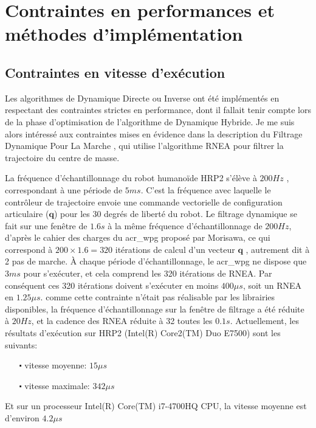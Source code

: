 \documentclass{report}
\begin{document}
\section{Contraintes en performances et méthodes d'implémentation} \label{ch_concepts_implEtContr}

\subsection{Contraintes en vitesse d'exécution}

Les algorithmes de Dynamique Directe ou Inverse ont été implémentés en respectant des contraintes strictes en performance, dont il fallait tenir compte lors de la phase d'optimisation de l'algorithme de Dynamique Hybride. Je me suis alors intéressé aux contraintes mises en évidence dans la description du Filtrage Dynamique Pour La Marche \cite{bib_filtrageTrajectoireCoM}, qui utilise l'algorithme RNEA pour filtrer la trajectoire du centre de masse.

La fréquence d'échantillonnage du robot humanoïde HRP2 s'élève à $200 Hz$ , correspondant à une période de $5 ms$. C'est la fréquence avec laquelle le contrôleur de trajectoire envoie une commande vectorielle de configuration articulaire ($\mathbf{q}$) pour les 30 degrés de liberté du robot. Le filtrage dynamique se fait sur une fenêtre de $1.6 s$ à la même fréquence d'échantillonnage de $200 Hz$, d'après le cahier des charges du \gls{acr_wpg} proposé par Morisawa, ce qui correspond à $200 \times 1.6 = 320$ itérations de calcul d'un vecteur $\mathbf{q}$ \cite[I.B et III.B]{bib_filtrageTrajectoireCoM}, autrement dit à 2 pas de marche. \`{A} chaque période d'échantillonnage, le \gls{acr_wpg} ne dispose que $3 ms$ pour s'exécuter, et cela comprend les 320 itérations de RNEA. Par conséquent ces 320 itérations doivent s'exécuter en moins $400 \mu s$, soit un RNEA en $1.25 \mu s$. comme cette contrainte n'était pas réalisable par les librairies disponibles, la fréquence d'échantillonnage sur la fenêtre de filtrage a été réduite à $20 Hz$, et la cadence des RNEA réduite à 32 toutes les $0.1 s$. Actuellement, les résultats d'exécution sur HRP2 (Intel(R) Core2(TM) Duo E7500) sont les suivants:
\begin{itemize}
\item[$\centerdot$ vitesse moyenne:] $15 \mu s$
\item[$\centerdot$ vitesse maximale:] $342 \mu s$
\end{itemize}
Et sur un processeur Intel(R) Core(TM) i7-4700HQ CPU, la vitesse moyenne est d'environ $4.2 \mu s$
\end{document}
